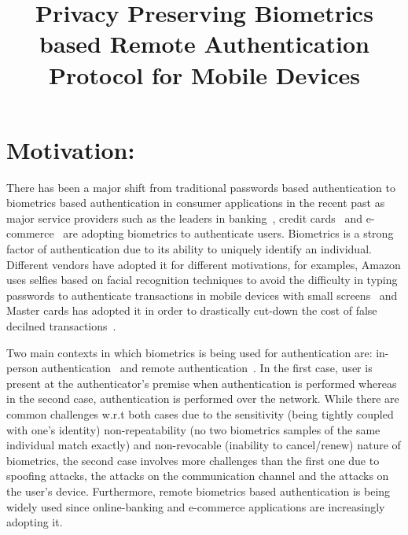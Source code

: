 \documentclass[10pt]{article}
\title{
\vspace{-20.mm}
Privacy Preserving Biometrics based Remote Authentication Protocol for Mobile Devices}
\begin{document}
\maketitle
\section{Motivation:}
There has been a major shift from traditional passwords based authentication to biometrics based authentication in consumer applications in the 
recent past as major service providers such as the leaders in banking~\cite{citi, hsbc, usaa}, credit cards~\cite{mastercard} and 
e-commerce~\cite{amazon, alibaba} are adopting biometrics to authenticate users.
Biometrics is a strong factor of authentication due to its ability to uniquely identify an individual. Different 
vendors have adopted it for different motivations, for examples, Amazon uses selfies based on facial recognition techniques to avoid the difficulty 
in typing passwords to authenticate transactions in mobile devices with small screens~\cite{amazon} and  Master cards has adopted it in order to 
drastically cut-down the cost of false decilned transactions~\cite{mastercard}.

Two main contexts in which biometrics is being used for authentication are: in-person authentication~\cite{google} and remote 
authentication~\cite{hsbc}. In the first case, user is present at the authenticator's premise when authentication is performed 
whereas in the second case, authentication is performed over the network. 
While there are common challenges w.r.t both cases due to the sensitivity (being tightly coupled with one's identity) non-repeatability (no 
two biometrics samples of the same individual match exactly) and non-revocable (inability to cancel/renew) nature of biometrics, the second case 
involves more challenges than the first one due to spoofing attacks, the attacks on the communication channel and the attacks on the user's 
device. Furthermore, remote biometrics based authentication is being widely 
used since online-banking and e-commerce applications are increasingly adopting it.
\end{document}
